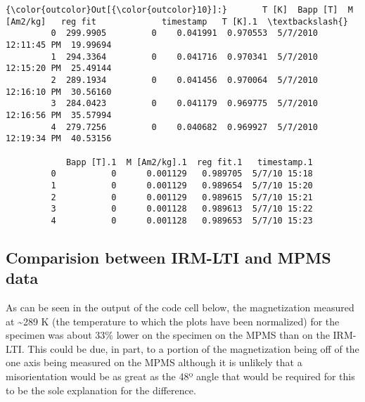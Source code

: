 \documentclass{article}
\begin{document}
            \begin{Verbatim}[commandchars=\\\{\}]
{\color{outcolor}Out[{\color{outcolor}10}]:}       T [K]  Bapp [T]  M [Am2/kg]   reg fit             timestamp   T [K].1  \textbackslash{}
         0  299.9905         0    0.041991  0.970553  5/7/2010 12:11:45 PM  19.99694   
         1  294.3364         0    0.041716  0.970341  5/7/2010 12:15:20 PM  25.49144   
         2  289.1934         0    0.041456  0.970064  5/7/2010 12:16:10 PM  30.56160   
         3  284.0423         0    0.041179  0.969775  5/7/2010 12:16:56 PM  35.57994   
         4  279.7256         0    0.040682  0.969927  5/7/2010 12:19:34 PM  40.53156   
         
            Bapp [T].1  M [Am2/kg].1  reg fit.1   timestamp.1  
         0           0      0.001129   0.989705  5/7/10 15:18  
         1           0      0.001129   0.989654  5/7/10 15:20  
         2           0      0.001129   0.989615  5/7/10 15:21  
         3           0      0.001128   0.989613  5/7/10 15:22  
         4           0      0.001128   0.989653  5/7/10 15:23  
\end{Verbatim}
        

    \subsection{Comparision between IRM-LTI and MPMS data}


    As can be seen in the output of the code cell below, the magnetization
measured at \textasciitilde{}289 K (the temperature to which the plots
have been normalized) for the specimen was about 33\% lower on the
specimen on the MPMS than on the IRM-LTI. This could be due, in part, to
a portion of the magnetization being off of the one axis being measured
on the MPMS although it is unlikely that a misorientation would be as
great as the 48º angle that would be required for this to be the sole
explanation for the difference.
\end{document}

